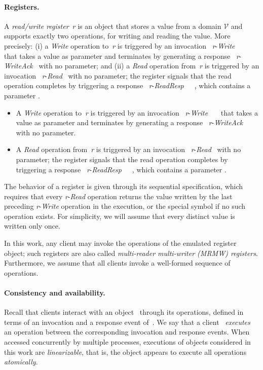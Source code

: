 \documentclass[oribibl]{llncs}
\theoremstyle{definition-boldhead}
\newcommand{\var}[1]{\textit{#1}}
\newcommand{\op}[1]{\textsl{#1}}
\newcommand{\event}[2]{~{\var{#1}}-\textsl{#2}~}
\newcommand{\eventt}[3]{~{\var{#1}}-\textsl{#2}~~{#3}~}
\newcommand{\values}{\ensuremath{\mathcal{V}}\xspace}
\begin{document}
\paragraph{Registers.}
A \emph{read/write register}~\var{r} is an object that stores a value from
a domain \values and supports exactly two operations, for writing and
reading the value.  More precisely:
\if\submit\yes
(i) a \emph{Write} operation to~\var{r} is triggered by an invocation \eventt{r}{Write}{} that takes a value  as parameter and terminates by generating a response \event{r}{WriteAck} with no parameter; and (ii) a \emph{Read} operation from~\var{r} is triggered by an invocation \event{r}{Read} with no parameter; the register signals that the read operation completes by triggering a response \eventt{r}{ReadResp}{}, which contains a parameter .
\else
\begin{itemize}
\item A \emph{Write} operation to~\var{r} is triggered by an
  invocation \eventt{r}{Write}{} that takes a value 
  as parameter and terminates by generating a response
  \event{r}{WriteAck} with no parameter.
\item A \emph{Read} operation from~\var{r} is triggered by an invocation
  \event{r}{Read} with no parameter; the register signals that the
  read operation completes by triggering a response
  \eventt{r}{ReadResp}{}, which contains a parameter .
\end{itemize}
\fi
The behavior of a register is given through its sequential
specification, which requires that every \var{r}-\op{Read} operation
returns the value written by the last preceding \var{r}-\op{Write}
operation in the execution, or the special symbol  if no such operation exists. For simplicity, we will assume
that every distinct value is written only once.

In this work, any client may invoke the operations of the emulated
register object; such registers are also called \emph{multi-reader
  multi-writer (MRMW) registers}.  Furthermore, we assume that all
clients invoke a well-formed sequence of operations.


\paragraph{Consistency and availability.}
Recall that clients interact with an object~ through its
operations, defined in terms of an invocation and a response event
of~.  We say that a client~ \emph{executes} an operation between
the corresponding invocation and response events.  When accessed
concurrently by multiple processes, executions of objects considered
in this work are \emph{linearizable}, that is, the object appears to
execute all operations \emph{atomically}.
\end{document}
